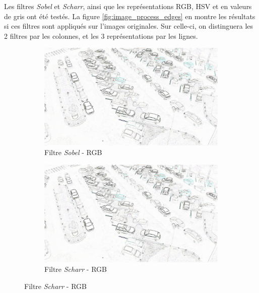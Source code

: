 Les filtres \textit{Sobel} et \textit{Scharr}, ainsi que les représentations RGB, HSV et en valeurs de gris ont été testés. La figure \ref{fig:image_process_edges} en montre les résultats si ces filtres sont appliqués sur l'images originales. Sur celle-ci, on distinguera les 2 filtres par les colonnes, et les 3 représentations par les lignes.

\begin{figure}[H]
    \begin{subfigure}{.5\textwidth}
        \centering
        \includegraphics[width=.85\linewidth]{img/conception/image_process/edges_only/0.png}
        \caption{Filtre \textit{Sobel} - RGB}
    \end{subfigure}%
    \begin{subfigure}{.5\textwidth}
        \centering
        \includegraphics[width=.85\linewidth]{img/conception/image_process/edges_only/3.png}
        \caption{Filtre \textit{Scharr} - RGB}
    \end{subfigure}%


\end{figure}
